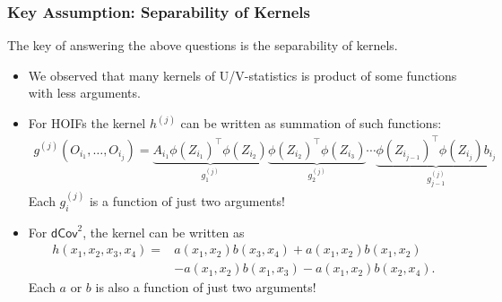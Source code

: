 \documentclass[9pt]{beamer}
\theoremstyle{mystyle}
\theoremstyle{mystyletwo}
\begin{document}
\begin{frame}
    \frametitle{Key Assumption: Separability of Kernels}
    The key of answering the above questions is the separability of kernels.
    \begin{itemize}
        \item We observed that many kernels of U/V-statistics is product of some functions with less arguments.
        \item For HOIFs the kernel $h^{(j)}$ can be written as summation of such functions:
              \begin{align*}
                  g^{(j)}(O_{i_1}, \ldots, O_{i_j}) = \underbrace{A_{i_{1}} \phi (Z_{i_{1}})^{\top} \phi(Z_{i_2})}_{g^{(j)}_1} \underbrace{\phi(Z_{i_2})^\top \phi(Z_{i_3})}_{g^{(j)}_2} \cdots \underbrace{\phi(Z_{i_{j-1}})^\top \phi(Z_{i_j}) b_{i_j}}_{g^{(j)}_{j-1}}
              \end{align*}
              Each $g_i^{(j)}$ is a function of just two arguments!
        \item For $\mathsf{dCov}^2$, the kernel can be written as
              \begin{align*}
                  h(x_1, x_2, x_3, x_4) = & a(x_1, x_2) b(x_3, x_4) + a(x_1, x_2) b(x_1, x_2)    \\
                                          & - a(x_1, x_2) b(x_1, x_3) - a(x_1, x_2) b(x_2, x_4).
              \end{align*}
              Each $a$ or $b$ is also a function of just two arguments!
    \end{itemize}
\end{frame}
\end{document}
